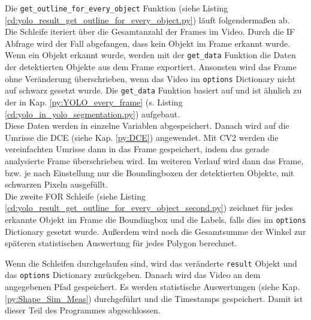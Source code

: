 {	Die \lstinline|get_outline_for_every_object| Funktion (siehe Listing \ref{cd:yolo_result_get_outline_for_every_object.py}) läuft folgendermaßen ab. \\
	Die Schleife iteriert über die Gesamtanzahl der Frames im Video. Durch die IF Abfrage wird der Fall abgefangen, dass kein Objekt im Frame erkannt wurde. Wenn ein Objekt erkannt wurde, werden mit der \lstinline|get_data| Funktion die Daten der detektierten Objekte aus dem Frame exportiert. Ansonsten wird das Frame ohne Veränderung überschrieben, wenn das Video im \lstinline|options| Dictionary nicht auf schwarz gesetzt wurde. Die \lstinline|get_data| Funktion basiert auf \citeauthor{Canu_pysource} \citep{Canu_pysource} und ist ähnlich zu der in Kap. \ref{py:YOLO_every_frame} (s. Listing \ref{cd:yolo_in_yolo_segmentation.py}) aufgebaut. \\
	Diese Daten werden in einzelne Variablen abgespeichert. Danach wird auf die Umrisse die DCE (siehe Kap. \ref{py:DCE}) angewendet. Mit CV2 werden die vereinfachten Umrisse dann in das Frame gespeichert, indem das gerade analysierte Frame überschrieben wird. Im weiteren Verlauf wird dann das Frame, bzw. je nach Einstellung nur die Boundingboxen der detektierten Objekte, mit schwarzen Pixeln ausgefüllt. \\
	
	Die zweite FOR Schleife (siehe Listing \ref{cd:yolo_result_get_outline_for_every_object_second.py}) zeichnet für jedes erkannte Objekt im Frame die Boundingbox und die Labels, falls dies im \lstinline|options| Dictionary gesetzt wurde. Außerdem wird noch die Gesamtsumme der Winkel  zur späteren statistischen Auswertung für jedes Polygon berechnet.
	
	Wenn die Schleifen durchgelaufen sind, wird das veränderte \lstinline|result| Objekt und das \lstinline|options| Dictionary zurückgeben. Danach wird das Video an dem angegebenen Pfad gespeichert. Es werden statistische Auswertungen (siehe Kap. \ref{py:Shape_Sim_Meas}) durchgeführt und die Timestamps gespeichert. Damit ist dieser Teil des  Programmes abgeschlossen. \\
	}


